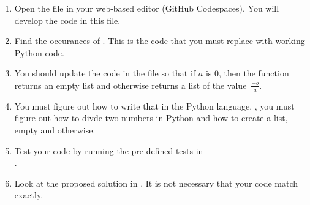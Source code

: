 \begin{enumerate}

\item Open the file  in your web-based editor (GitHub Codespaces).
  You will develop the code in this file.

\item Find the occurances of .  This is the code that you must replace with working Python code.

\item You should update the code in the file  so that if
$a$ is 0, then the function returns an empty list and otherwise
  returns a list of the value~$\frac{-b}{a}$.

\item You must figure out how
to write that in the Python language.  \Ie, you must figure out how to
divde two numbers in Python and how to create a list, empty and
otherwise.


\item Test your code by running the pre-defined tests in \\
  .

\item Look at the proposed solution in .  It is not necessary that your code match exactly.

\end{enumerate}
